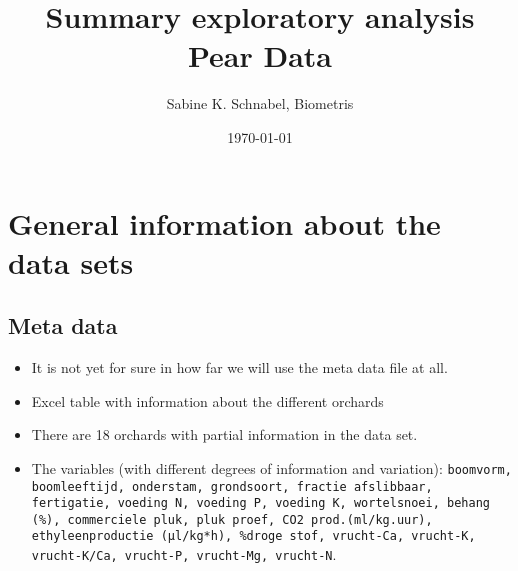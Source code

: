 \documentclass[12pt, a4paper]{article}
\title{Summary exploratory analysis Pear Data}
\author{Sabine K. Schnabel, Biometris}
\date{\today}
\begin{document}
\maketitle

\section*{General information about the data sets}

\subsection*{Meta data}
\begin{itemize}
\item It is not yet for sure in how far we will use the meta data file at all.
\item Excel table with information about the different orchards
\item There are 18 orchards with partial information in the data set.
\item The variables (with different degrees of information and variation): \texttt{boomvorm, boomleeftijd, onderstam, 
	grondsoort, fractie afslibbaar, fertigatie, voeding N, voeding P, voeding K, wortelsnoei, behang (\%), 
	commerciele pluk, pluk proef, CO2 prod.(ml/kg.uur), ethyleenproductie (μl/kg*h), \%droge stof, vrucht-Ca, vrucht-K, vrucht-K/Ca, vrucht-P, vrucht-Mg, vrucht-N}.
\end{itemize}
\end{document}
